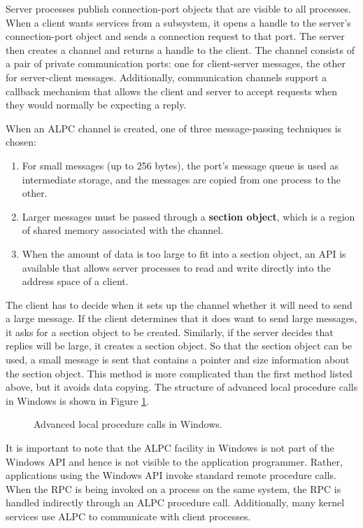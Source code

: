 Server processes publish connection-port objects that are visible to all processes. When a client wants services from a subsystem, it opens a handle to the server's connection-port object and sends a connection request to that port. The server then creates a channel and returns a handle to the client. The channel consists of a pair of private communication ports: one for client-server messages, the other for server-client messages. Additionally, communication channels support a callback mechanism that allows the client and server to accept requests when they would normally be expecting a reply.

When an ALPC channel is created, one of three message-passing techniques is chosen:
\begin{enumerate}
\item For small messages (up to 256 bytes), the port's message queue is used as intermediate storage, and the messages are copied from one process to the other.
\item Larger messages must be passed through a \textbf{section object}, which is a region of shared memory associated with the channel.
\item When the amount of data is too large to fit into a section object, an API is available that allows server processes to read and write directly into the address space of a client.
\end{enumerate}
The client has to decide when it sets up the channel whether it will need to send a large message. If the client determines that it does want to send large messages, it asks for a section object to be created. Similarly, if the server decides that replies will be large, it creates a section object. So that the section object can be used, a small message is sent that contains a pointer and size information about the section object. This method is more complicated than the first method listed above, but it avoids data copying. The structure of advanced local procedure calls in Windows is shown in Figure \ref{fig:windows-alpc}.

\begin{figure}[h!]
\centering
\caption{Advanced local procedure calls in Windows.}\label{fig:windows-alpc}
\end{figure}

It is important to note that the ALPC facility in Windows is not part of the Windows API and hence is not visible to the application programmer. Rather, applications using the Windows API invoke standard remote procedure calls. When the RPC is being invoked on a process on the same system, the RPC is handled indirectly through an ALPC procedure call. Additionally, many kernel services use ALPC to communicate with client processes.

